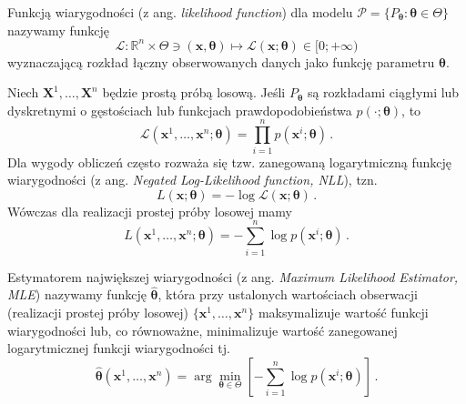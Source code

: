 \documentclass{myclass}
\numberwithin{equation}{section}
\begin{document}
\begin{definition}
Funkcją wiarygodności (z ang. \textit{likelihood function}) dla modelu \(\mathcal{P} =
\{P_{\boldsymbol{\theta}} : \boldsymbol{\theta} \in \Theta\}\) nazywamy funkcję
\begin{equation*}
    \mathcal{L}: \mathbb{R}^n \times \Theta \ni (\mathbf{x},\boldsymbol{\theta}) \mapsto \mathcal{L}(\mathbf{x};\boldsymbol{\theta}) \in [0; +\infty)
\end{equation*}
wyznaczającą rozkład łączny obserwowanych danych jako funkcję parametru \(\boldsymbol{\theta}\).    
\end{definition}
Niech \(\mathbf{X}^1,\ldots,\mathbf{X}^n\) będzie prostą próbą losową. Jeśli
\(P_{\boldsymbol{\theta}}\) są rozkładami ciągłymi lub dyskretnymi o gęstościach lub funkcjach
prawdopodobieństwa \(p(\cdot;\boldsymbol{\theta})\), to
\begin{equation}
    \mathcal{L}(\mathbf{x}^1,\ldots,\mathbf{x}^n;\boldsymbol{\theta}) = \prod_{i=1}^n p(\mathbf{x}^i;\boldsymbol{\theta})\,.
\end{equation}
Dla wygody obliczeń często rozważa się tzw. zanegowaną logarytmiczną funkcję wiarygodności (z ang.
\textit{Negated Log-Likelihood function, NLL}), tzn.
\begin{equation}
    L(\mathbf{x};\boldsymbol{\theta}) = - \log \mathcal{L}(\mathbf{x};\boldsymbol{\theta})\,.
\end{equation}
Wówczas dla realizacji prostej próby losowej mamy
\begin{equation}
    L(\mathbf{x}^1,\ldots,\mathbf{x}^n;\boldsymbol{\theta}) = -\sum_{i=1}^n \log p(\mathbf{x}^i;\boldsymbol{\theta})\,.
\end{equation}

\begin{definition}
Estymatorem największej wiarygodności (z ang. \textit{Maximum Likelihood Estimator, MLE}) nazywamy
funkcję \(\boldsymbol{\hat{\theta}}\), która przy ustalonych wartościach obserwacji (realizacji
prostej próby losowej) \(\{\mathbf{x}^1,\ldots,\mathbf{x}^n\}\) maksymalizuje wartość funkcji
wiarygodności lub, co równoważne, minimalizuje wartość zanegowanej logarytmicznej funkcji
wiarygodności tj.
\begin{equation*}
    \boldsymbol{\hat \theta}(\mathbf{x}^1,\ldots,\mathbf{x}^n) = \arg \min_{\boldsymbol{\theta} \in \Theta} \left[- \sum_{i=1}^n \log p(\mathbf{x}^i ; \boldsymbol{\theta})\right]\,.
\end{equation*}
\end{definition}
    
\end{document}

